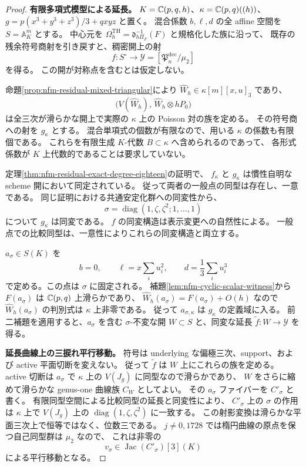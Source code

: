 \begin{proof}
\textbf{有限多項式模型による延長。}
$K=\mathbb C(p,q,h)$、$\kappa=\mathbb C(p,q)((h))$、
$g=p(x^3+y^3+z^3)/3+qxyz$ と置く。
混合係数 $b,\ell,d$ の全 affine 空間を $S=\mathbb A_K^m$ とする。
中心元を $\Omega_h^{\mathrm{TH}}=\mathfrak d_{h\Pi_F}^{-1}(F)$ と規格化した族に沿って、
既存の残余符号商射を引き戻すと、稠密開上の射
\[
 f:S^\circ\longrightarrow
     \mathcal Y=[\mathfrak P_n^{\mathrm{dec}}/\mu_2]
\]
を得る。
この開が対称点を含むとは仮定しない。

命題\ref{prop:nfm-residual-mixed-triangular}により
$\widehat W_h\in\kappa[m][x,u]_3$ であり、
\[
 \bigl(V(\widehat W_h),\,\widehat W_h\otimes hP_0\bigr)
\]
は全三次が滑らかな開上で実際の $\kappa$ 上の Poisson 対の族を定める。
その符号商への射を $g_\kappa$ とする。
混合単項式の個数が有限なので、用いる $\kappa$ の係数も有限個である。
これらを有限生成 $K$-代数 $B\subset\kappa$ へ含められるのであって、
各形式係数が $K$ 上代数的であることは要求していない。

定理\ref{thm:nfm-residual-exact-degree-eighteen}の証明で、
$f_\kappa$ と $g_\kappa$ は慣性自明な scheme 開において同定されている。
従って両者の一般点の同型は存在し、一意である。
同じ証明における共通安定化群への同変性から、
\[
 \sigma=\operatorname{diag}(1,\zeta,\zeta^2;1,\ldots,1)
\]
について $g_\kappa$ は同変である。
$f$ の同変構造は表示変更への自然性による。
一般点での比較同型は、一意性によりこれらの同変構造と両立する。

$a_\sigma\in S(K)$ を
\[
 b=0,\qquad \ell=x\sum_i u_i^2,\qquad d=\frac13\sum_i u_i^3
\]
で定める。この点は $\sigma$ に固定される。
補題\ref{lem:nfm-cyclic-scalar-witness}から
$F(a_\sigma)$ は $\mathbb C(p,q)$ 上滑らかであり、
$\widehat W_h(a_\sigma)=F(a_\sigma)+O(h)$ なので
$\widehat W_h(a_\sigma)$ の判別式は $\kappa$ 上非零である。
従って $a_{\sigma,\kappa}$ は $g_\kappa$ の定義域に入る。
前二補題を適用すると、$a_\sigma$ を含む $\sigma$-不変な開
$W\subset S$ と、同変な延長 $\widetilde f:W\to\mathcal Y$ を得る。

\textbf{延長曲線上の三捩れ平行移動。}
符号は underlying な偏極三次、support、および active 平面切断を変えない。
従って $\widetilde f$ は $W$ 上にこれらの族を定める。
active 切断は $a_\sigma$ で $\kappa$ 上の $V(J_g)$ に同型なので滑らかであり、
$W$ をさらに縮めて滑らかな genus-one 曲線族 $C_W$ としてよい。
その $a_\sigma$ ファイバーを $C'_\sigma$ と書く。
有限同型空間による比較同型の延長と同変性により、
$C'_\sigma$ 上の $\sigma$ の作用は $\kappa$ 上で
$V(J_g)$ 上の $\operatorname{diag}(1,\zeta,\zeta^2)$ に一致する。
この射影変換は滑らかな平面三次上で恒等ではなく、位数三である。
$j\ne0,1728$ では楕円曲線の原点を保つ自己同型群は $\mu_2$ なので、
これは非零の
\[
 v_\sigma\in\operatorname{Jac}(C'_\sigma)[3](K)
\]
による平行移動となる。


\end{proof}
